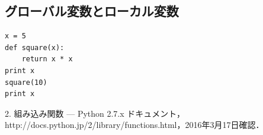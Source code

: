 \documentclass[11pt]{jarticle}
\begin{document}
\subsection{グローバル変数とローカル変数}
\begin{lstlisting}[basicstyle=\ttfamily\footnotesize, frame=single]
x = 5
def square(x):
	return x * x
print x
square(10)
print x
\end{lstlisting}
\begin{thebibliography}{10}
 2. 組み込み関数 — Python 2.7.x ドキュメント，http://docs.python.jp/2/library/functions.html，2016年3月17日確認．
\end{thebibliography}
\end{document}
